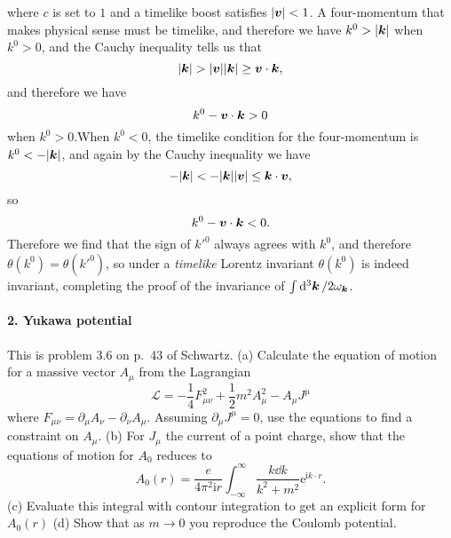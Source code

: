 \documentclass[hyperref, a4paper]{article}
\newcommand*{\ii}{\mathrm{i}}
\newcommand*{\ee}{\mathrm{e}}
\begin{document}
\begin{itemize}
    where $c$ is set to $1$ and a timelike boost satisfies $\abs{\vb*{v}} < 1$.
    A four-momentum that makes physical sense must be timelike, and therefore we have $k^0 > \abs{\vb*{k}}$ when $k^0 > 0$, and the Cauchy inequality tells us that 
    \[
        \abs{\vb*{k}} > \abs{\vb*{v}} \abs{\vb*{k}} \geq \vb*{v} \cdot \vb*{k},
    \]
    and therefore we have 
    \[
        k^0 - \vb*{v} \cdot \vb*{k} > 0
    \]
    when $k^0 > 0$.When $k^0 < 0$, the timelike condition for the four-momentum is $k^0 < - \abs{\vb*{k}}$, and again by the Cauchy inequality we have
    \[
        - \abs{\vb*{k}} < - \abs{\vb*{k}} \abs{\vb*{v}} \leq \vb*{k} \cdot \vb*{v},
    \]
    so 
    \[
        k^0 - \vb*{v} \cdot \vb*{k} < 0.
    \]
    Therefore we find that the sign of $k'^0$ always agrees with $k^0$, and therefore $\theta(k^0) = \theta(k'^0)$, so under a \emph{timelike} Lorentz invariant $\theta(k^0)$ is indeed invariant, completing the proof of the invariance of $\int \dd[3]{\vb*{k}} / 2 \omega_{\vb*{k}}$.
\end{itemize}

\paragraph{2. Yukawa potential} This is problem $3.6$ on p.~43 of Schwartz.
(a) Calculate the equation of motion for a massive vector $A_{\mu}$ from the Lagrangian
\[
\mathcal{L}=-\frac{1}{4} F_{\mu \nu}^{2}+\frac{1}{2} m^{2} A_{\mu}^{2}-A_{\mu} J^{\mu}
\]
where $F_{\mu \nu}=\partial_{\mu} A_{\nu}-\partial_{\nu} A_{\mu}$. Assuming $\partial_{\mu} J^{\mu}=0$, use the equations to find a constraint on $A_{\mu}$.
(b) For $J_{\mu}$ the current of a point charge, show that the equations of motion for $A_{0}$ reduces to
\begin{equation}
    A_{0}(r)=\frac{e}{4 \pi^{2} \ii r} \int_{-\infty}^{\infty} \frac{k \dd k}{k^{2}+m^{2}} \ee^{\ii k \cdot r}.
    \label{eq:schwartz-3-6-2}
\end{equation}
(c) Evaluate this integral with contour integration to get an explicit form for $A_{0}(r)$
(d) Show that as $m \rightarrow 0$ you reproduce the Coulomb potential.
\end{document}
